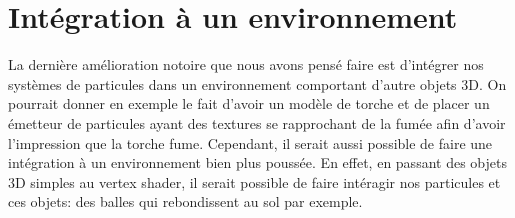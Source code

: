 \section{Intégration à un environnement}
La dernière amélioration notoire que nous avons pensé faire est d'intégrer nos systèmes
de particules dans un environnement comportant d'autre objets 3D. On pourrait donner
en exemple le fait d'avoir un modèle de torche et de placer un émetteur de particules
ayant des textures se rapprochant de la fumée afin d'avoir l'impression que la torche fume.
Cependant, il serait aussi possible de faire une intégration à un environnement bien plus poussée.
En effet, en passant des objets 3D simples au vertex shader, il serait possible de faire
intéragir nos particules et ces objets: des balles qui rebondissent au sol par exemple. 
